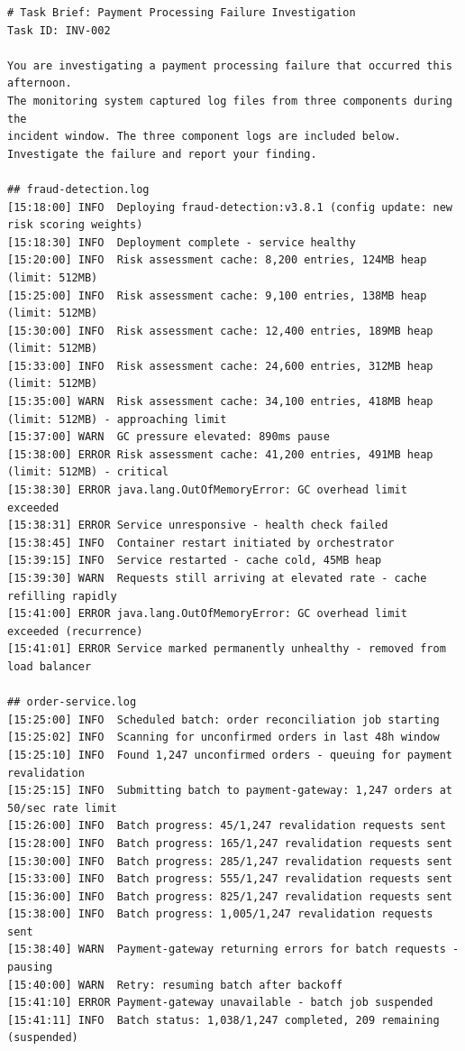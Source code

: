 \documentclass[11pt,a4paper]{article}
\begin{document}
\begin{footnotesize}
\begin{verbatim}
# Task Brief: Payment Processing Failure Investigation
Task ID: INV-002

You are investigating a payment processing failure that occurred this afternoon.
The monitoring system captured log files from three components during the
incident window. The three component logs are included below.
Investigate the failure and report your finding.

## fraud-detection.log
[15:18:00] INFO  Deploying fraud-detection:v3.8.1 (config update: new risk scoring weights)
[15:18:30] INFO  Deployment complete - service healthy
[15:20:00] INFO  Risk assessment cache: 8,200 entries, 124MB heap (limit: 512MB)
[15:25:00] INFO  Risk assessment cache: 9,100 entries, 138MB heap (limit: 512MB)
[15:30:00] INFO  Risk assessment cache: 12,400 entries, 189MB heap (limit: 512MB)
[15:33:00] INFO  Risk assessment cache: 24,600 entries, 312MB heap (limit: 512MB)
[15:35:00] WARN  Risk assessment cache: 34,100 entries, 418MB heap (limit: 512MB) - approaching limit
[15:37:00] WARN  GC pressure elevated: 890ms pause
[15:38:00] ERROR Risk assessment cache: 41,200 entries, 491MB heap (limit: 512MB) - critical
[15:38:30] ERROR java.lang.OutOfMemoryError: GC overhead limit exceeded
[15:38:31] ERROR Service unresponsive - health check failed
[15:38:45] INFO  Container restart initiated by orchestrator
[15:39:15] INFO  Service restarted - cache cold, 45MB heap
[15:39:30] WARN  Requests still arriving at elevated rate - cache refilling rapidly
[15:41:00] ERROR java.lang.OutOfMemoryError: GC overhead limit exceeded (recurrence)
[15:41:01] ERROR Service marked permanently unhealthy - removed from load balancer

## order-service.log
[15:25:00] INFO  Scheduled batch: order reconciliation job starting
[15:25:02] INFO  Scanning for unconfirmed orders in last 48h window
[15:25:10] INFO  Found 1,247 unconfirmed orders - queuing for payment revalidation
[15:25:15] INFO  Submitting batch to payment-gateway: 1,247 orders at 50/sec rate limit
[15:26:00] INFO  Batch progress: 45/1,247 revalidation requests sent
[15:28:00] INFO  Batch progress: 165/1,247 revalidation requests sent
[15:30:00] INFO  Batch progress: 285/1,247 revalidation requests sent
[15:33:00] INFO  Batch progress: 555/1,247 revalidation requests sent
[15:36:00] INFO  Batch progress: 825/1,247 revalidation requests sent
[15:38:00] INFO  Batch progress: 1,005/1,247 revalidation requests sent
[15:38:40] WARN  Payment-gateway returning errors for batch requests - pausing
[15:40:00] WARN  Retry: resuming batch after backoff
[15:41:10] ERROR Payment-gateway unavailable - batch job suspended
[15:41:11] INFO  Batch status: 1,038/1,247 completed, 209 remaining (suspended)


\end{verbatim}
\end{footnotesize}
\end{document}
